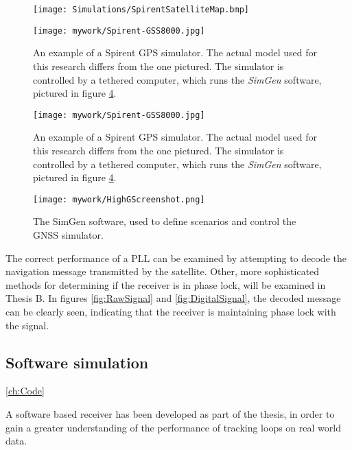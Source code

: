 \begin{figure}[!htb] 
    \centering
    \texttt{[image: Simulations/SpirentSatelliteMap.bmp]} 
    \caption{}
    \label{fig:SpirentSatelliteMap}
\end{figure}


\begin{figure}[!htb] 
    \centering
    \texttt{[image: mywork/Spirent-GSS8000.jpg]} 
    \caption{An example of a Spirent \ac{GPS} simulator. The actual model used for this research differs from the one pictured. The simulator is controlled by a tethered computer, which runs the \emph{SimGen} software, pictured in figure \ref{:HighGScreenshot}.}
    \label{fig:Spirent}
\end{figure}


\begin{figure}[!htb] 
    \centering
    \texttt{[image: mywork/Spirent-GSS8000.jpg]} 
    \caption{An example of a Spirent \ac{GPS} simulator. The actual model used for this research differs from the one pictured. The simulator is controlled by a tethered computer, which runs the \emph{SimGen} software, pictured in figure \ref{:HighGScreenshot}.}
    \label{fig:Spirent}
\end{figure}

\begin{figure}[!htb] 
    \centering
    \texttt{[image: mywork/HighGScreenshot.png]} 
    \caption{The SimGen software, used to define scenarios and control the \ac{GNSS} simulator.}
    \label{:HighGScreenshot}
\end{figure}


The correct performance of a \ac{PLL} can be examined by attempting to decode the navigation message transmitted by the satellite. Other, more sophisticated methods for determining if the  receiver is in phase lock, will be examined in Thesis B. In figures \ref{fig:RawSignal} and \ref{fig:DigitalSignal}, the decoded message can be clearly seen, indicating that the receiver is maintaining phase lock with the signal.

\subsection{Software simulation}
\ref{ch:Code}

A software based receiver has been developed as part of the thesis, in order to gain a greater understanding of the performance of tracking loops on real world data. 

